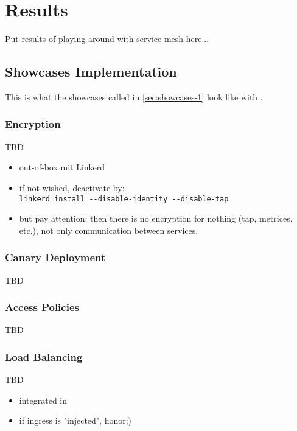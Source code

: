 \section{Results}

Put results of playing around with service mesh here...

\subsection{Showcases Implementation}
This is what the showcases called in \autoref{sec:showcases-1} look like with \linkerd{}.

\subsubsection{Encryption}
TBD
\begin{itemize}
	\item out-of-box mit Linkerd 
		\item if not wished, deactivate by: \\
			\lstinline|linkerd install --disable-identity --disable-tap|
	\item but pay attention: then there is no encryption for nothing (tap, metrices, etc.), not only communication between services.
\end{itemize}

\subsubsection{Canary Deployment}
TBD

\subsubsection{Access Policies}
TBD

\subsubsection{Load Balancing}
TBD
\begin{itemize}
	\item integrated in \linkerd{}
	\item if ingress is "injected", honor;)
\end{itemize}


